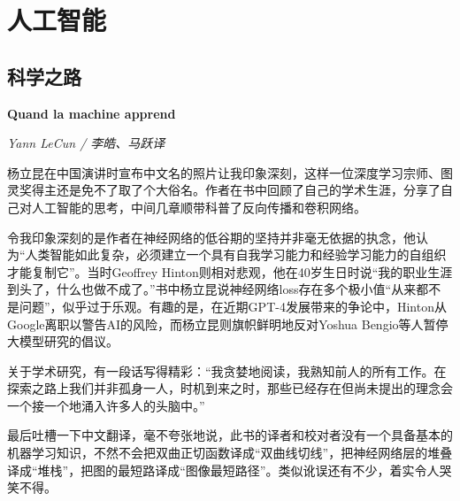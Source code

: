 \section{人工智能}

\subsection*{科学之路}
\par \textbf{Quand la machine apprend}
\par \emph{Yann LeCun / 李皓、马跃译}

\par 杨立昆在中国演讲时宣布中文名的照片让我印象深刻，这样一位深度学习宗师、图灵奖得主还是免不了取了个大俗名。作者在书中回顾了自己的学术生涯，分享了自己对人工智能的思考，中间几章顺带科普了反向传播和卷积网络。
\par 令我印象深刻的是作者在神经网络的低谷期的坚持并非毫无依据的执念，他认为“人类智能如此复杂，必须建立一个具有自我学习能力和经验学习能力的自组织才能复制它”。当时Geoffrey Hinton则相对悲观，他在40岁生日时说“我的职业生涯到头了，什么也做不成了。”书中杨立昆说神经网络loss存在多个极小值“从来都不是问题”，似乎过于乐观。有趣的是，在近期GPT-4发展带来的争论中，Hinton从Google离职以警告AI的风险，而杨立昆则旗帜鲜明地反对Yoshua Bengio等人暂停大模型研究的倡议。
\par 关于学术研究，有一段话写得精彩：“我贪婪地阅读，我熟知前人的所有工作。在探索之路上我们并非孤身一人，时机到来之时，那些已经存在但尚未提出的理念会一个接一个地涌入许多人的头脑中。”
\par 最后吐槽一下中文翻译，毫不夸张地说，此书的译者和校对者没有一个具备基本的机器学习知识，不然不会把双曲正切函数译成“双曲线切线”，把神经网络层的堆叠译成“堆栈”，把图的最短路译成“图像最短路径”。类似讹误还有不少，着实令人哭笑不得。
\par {}
